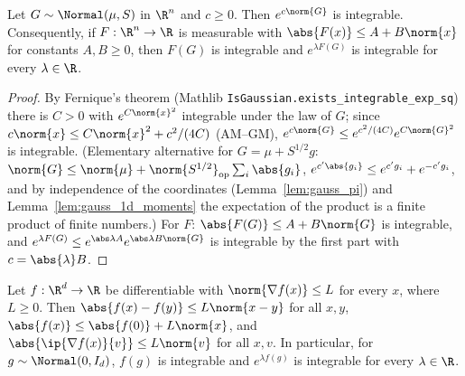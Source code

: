 \begin{lemma}\label{lem:pc_exp_norm_integrable}
\leanok
{}
Let $G \sim \Normal(\mu, S)$ in $\R^n$ and $c \ge 0$. Then $e^{c\norm{G}}$ is integrable.
Consequently, if $F : \R^n \to \R$ is measurable with $\abs{F(x)} \le A + B\norm{x}$ for
constants $A, B \ge 0$, then $F(G)$ is integrable and $e^{\lambda F(G)}$ is integrable for every
$\lambda \in \R$.
\end{lemma}

\begin{proof}
\leanok
{}
By Fernique's theorem (Mathlib \texttt{IsGaussian.exists\_integrable\_exp\_sq}) there is
$C > 0$ with $e^{C\norm{x}^2}$ integrable under the law of $G$; since
$c\norm{x} \le C\norm{x}^2 + c^2/(4C)$ (AM--GM), $e^{c\norm{G}} \le e^{c^2/(4C)}e^{C\norm{G}^2}$
is integrable. (Elementary alternative for $G = \mu + S^{1/2}g$: $\norm{G} \le \norm{\mu} +
\norm{S^{1/2}}_{\mathrm{op}}\sum_i\abs{g_i}$, $e^{c'\abs{g_i}} \le e^{c'g_i} + e^{-c'g_i}$, and
by independence of the coordinates (Lemma~\ref{lem:gauss_pi}) and
Lemma~\ref{lem:gauss_1d_moments} the expectation of the product is a finite product of finite
numbers.) For $F$: $\abs{F(G)} \le A + B\norm{G}$ is integrable, and
$e^{\lambda F(G)} \le e^{\abs\lambda A}e^{\abs\lambda B\norm{G}}$ is integrable by the first
part with $c = \abs{\lambda}B$.
\end{proof}

\begin{lemma}\label{lem:pc_lipschitz_of_grad}
\leanok
Let $f : \R^d \to \R$ be differentiable with $\norm{\nabla f(x)} \le L$ for every $x$, where
$L \ge 0$. Then $\abs{f(x) - f(y)} \le L\norm{x-y}$ for all $x,y$, $\abs{f(x)} \le \abs{f(0)} +
L\norm{x}$, and $\abs{\ip{\nabla f(x)}{v}} \le L\norm{v}$ for all $x, v$. In particular, for
$g \sim \Normal(0,I_d)$, $f(g)$ is integrable and $e^{\lambda f(g)}$ is integrable for every
$\lambda\in\R$.
\end{lemma}

